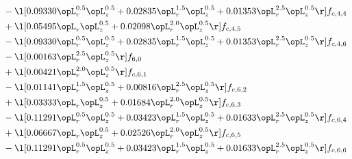 \begin{alignat}{2}
& - \l[  0.09330 \opL_r^{0.5} \opL_z^{0.5} +  0.02835 \opL_r^{1.5} \opL_z^{0.5} +  0.01353 \opL_r^{2.5} \opL_z^{0.5}  \r] f_{c,4,4} \nonumber \\ 
& + \l[  0.05495 \opL_r \opL_z^{0.5} +  0.02098 \opL_r^{2.0} \opL_z^{0.5}  \r] f_{c,4,5} \nonumber \\ 
& - \l[  0.09330 \opL_r^{0.5} \opL_z^{0.5} +  0.02835 \opL_r^{1.5} \opL_z^{0.5} +  0.01353 \opL_r^{2.5} \opL_z^{0.5}  \r] f_{c,4,6} \nonumber \\ 
& - \l[  0.00163 \opL_r^{2.5} \opL_z^{0.5}  \r] f_{6,0} \nonumber \\ 
& + \l[  0.00421 \opL_r^{2.0} \opL_z^{0.5}  \r] f_{c,6,1} \nonumber \\ 
& - \l[  0.01141 \opL_r^{1.5} \opL_z^{0.5} +  0.00816 \opL_r^{2.5} \opL_z^{0.5}  \r] f_{c,6,2} \nonumber \\ 
& + \l[  0.03333 \opL_r \opL_z^{0.5} +  0.01684 \opL_r^{2.0} \opL_z^{0.5}  \r] f_{c,6,3} \nonumber \\ 
& - \l[  0.11291 \opL_r^{0.5} \opL_z^{0.5} +  0.03423 \opL_r^{1.5} \opL_z^{0.5} +  0.01633 \opL_r^{2.5} \opL_z^{0.5}  \r] f_{c,6,4} \nonumber \\ 
& + \l[  0.06667 \opL_r \opL_z^{0.5} +  0.02526 \opL_r^{2.0} \opL_z^{0.5}  \r] f_{c,6,5} \nonumber \\ 
& - \l[  0.11291 \opL_r^{0.5} \opL_z^{0.5} +  0.03423 \opL_r^{1.5} \opL_z^{0.5} +  0.01633 \opL_r^{2.5} \opL_z^{0.5}  \r] f_{c,6,6} \nonumber \\ 
\end{alignat} 


